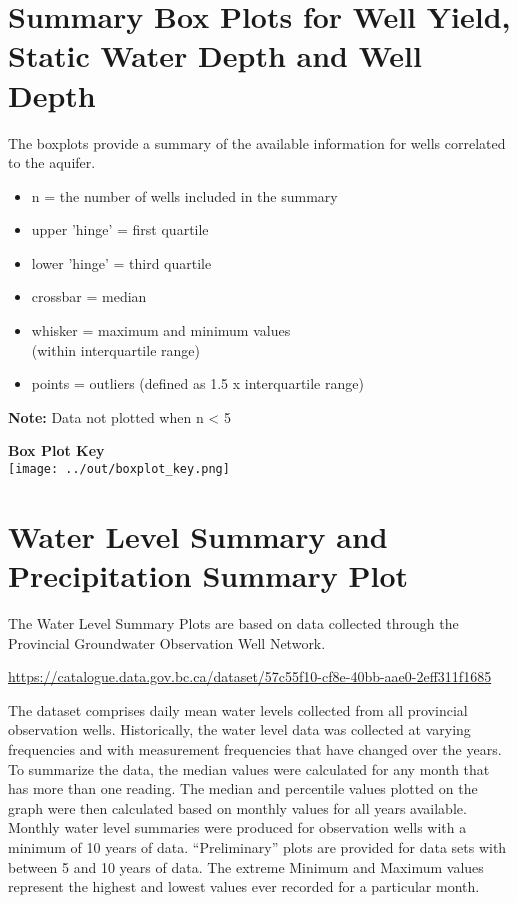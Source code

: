 \documentclass[11pt,]{article}
\begin{document}
\begin{minipage}[t]{0.6\textwidth}
  \section{Summary Box Plots for Well Yield, Static Water Depth and Well Depth}
  \vspace{3mm}
  The boxplots provide a summary of the available information for wells correlated to the aquifer.\\
  
  \begin{itemize}
    \item n = the number of wells included in the summary
    \item upper 'hinge' = first quartile
    \item lower 'hinge' = third quartile
    \item crossbar = median
    \item whisker = maximum and minimum values\\(within interquartile range)
    \item points = outliers (defined as 1.5 x interquartile range)
  \end{itemize}
  
  \vspace{0.5cm}
  
  \textbf{Note:} Data not plotted when n < 5
  
  \vspace{0.5cm}
  
\end{minipage}\begin{minipage}[t]{0.4\textwidth}
  \centering
  \textbf{Box Plot Key}\\
  \texttt{[image: ../out/boxplot\_key.png]}
\end{minipage}

\section{Water Level Summary and Precipitation Summary
Plot}\label{water-level-summary-and-precipitation-summary-plot}

The Water Level Summary Plots are based on data collected through the
Provincial Groundwater Observation Well Network.

\url{https://catalogue.data.gov.bc.ca/dataset/57c55f10-cf8e-40bb-aae0-2eff311f1685}

The dataset comprises daily mean water levels collected from all
provincial observation wells. Historically, the water level data was
collected at varying frequencies and with measurement frequencies that
have changed over the years. To summarize the data, the median values
were calculated for any month that has more than one reading. The median
and percentile values plotted on the graph were then calculated based on
monthly values for all years available. Monthly water level summaries
were produced for observation wells with a minimum of 10 years of data.
``Preliminary'' plots are provided for data sets with between 5 and 10
years of data. The extreme Minimum and Maximum values represent the
highest and lowest values ever recorded for a particular month.
\end{document}

